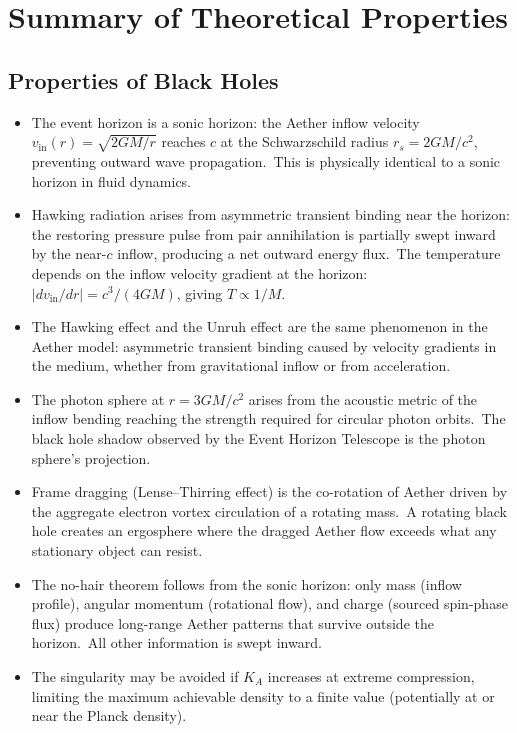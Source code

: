 ﻿\documentclass[12pt,letterpaper]{article}
\newcommand{\Ka}{K_{\!A}}
\newcommand{\vin}{v_{\mathrm{in}}}
\newcommand{\rs}{r_s}
\begin{document}
\section{Summary of Theoretical Properties}

\subsection{Properties of Black Holes}

\begin{itemize}[leftmargin=2em]
  \item The event horizon is a sonic horizon: the Aether inflow velocity $\vin(r) = \sqrt{2GM/r}$
    reaches $c$ at the Schwarzschild radius $\rs = 2GM/c^2$, preventing outward wave
    propagation.\ This is physically identical to a sonic horizon in fluid dynamics.
  \item Hawking radiation arises from asymmetric transient binding near the horizon: the
    restoring pressure pulse from pair annihilation is partially swept inward by the
    near-$c$ inflow, producing a net outward energy flux.\ The temperature depends on the
    inflow velocity gradient at the horizon: $|d\vin/dr| = c^3/(4GM)$, giving $T \propto 1/M$.
  \item The Hawking effect and the Unruh effect are the same phenomenon in the Aether model:
    asymmetric transient binding caused by velocity gradients in the medium, whether from
    gravitational inflow or from acceleration.
  \item The photon sphere at $r = 3GM/c^2$ arises from the acoustic metric of the inflow
    bending reaching the strength required for circular photon orbits.\ The black hole
    shadow observed by the Event Horizon Telescope is the photon sphere's projection.
  \item Frame dragging (Lense--Thirring effect) is the co-rotation of Aether driven by the
    aggregate electron vortex circulation of a rotating mass.\ A rotating black hole
    creates an ergosphere where the dragged Aether flow exceeds what any stationary object
    can resist.
  \item The no-hair theorem follows from the sonic horizon: only mass (inflow profile),
    angular momentum (rotational flow), and charge (sourced spin-phase
    flux) produce long-range Aether patterns that survive outside the horizon.\ All
    other information is swept inward.
  \item The singularity may be avoided if $\Ka$ increases at extreme compression, limiting the
    maximum achievable density to a finite value (potentially at or near the Planck
    density).
\end{itemize}
\end{document}
